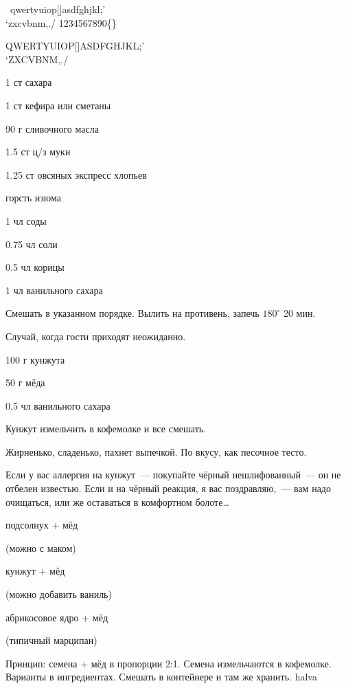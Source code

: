 \newpage
\pagestyle{empty}
\titlePM\label{sec:sweet}
\newpage
\pagestyle{chap}
{\wb{18pt}{18pt}\ qwertyuiop[]asdfghjkl;'\\`zxcvbnm,./ 1234567890\{\}

QWERTYUIOP[]ASDFGHJKL;'\\`ZXCVBNM,./ }
\newpage


{
\item 1 ст сахара
\item 1 ст кефира или сметаны
\item 90 г сливочного масла
\item 1.5 ст ц/з муки
\item 1.25 ст овсяных экспресс хлопьев %
\item горсть изюма
}{
\item 1 чл соды
\item 0.75 чл соли
\item 0.5 чл корицы
\item 1 чл ванильного сахара
}{
Смешать в указанном порядке. Вылить на противень, запечь $180^{\circ}$ 20 мин.
}{
\begin{advice}
\item Случай, когда гости приходят неожиданно.
\end{advice}}{}



{\label{cookies}
\item 100 г кунжута 
\item 50 г мёда
}{
\item 0.5 чл ванильного сахара
}{
Кунжут измельчить в кофемолке и все смешать.
}{
\begin{advice}
    \item  Жирненько, сладенько, пахнет выпечкой. По вкусу, как песочное тесто.
\item Если у вас аллергия на кунжут~--- покупайте чёрный нешлифованный~— он не отбелен известью. Если и на чёрный реакция, я вас поздравляю,~— вам надо очищаться, или же оставаться в комфортном болоте\ldots

\end{advice}}{}



{


\item подсолнух + мёд

    (можно с маком)
\item кунжут + мёд 

    (можно добавить ваниль)
\item абрикосовое ядро + мёд 

    (типичный марципан)

}{%
\item[]
}{
Принцип: семена + мёд в пропорции 2:1. Семена измельчаются в кофемолке. Варианты в ингредиентах.
Смешать в контейнере и там же хранить.
}{}{halva}



